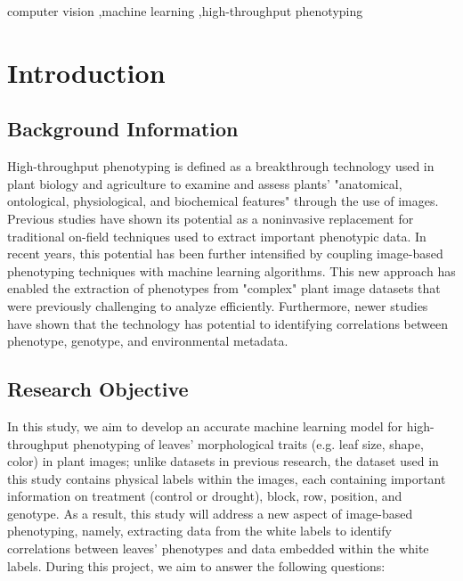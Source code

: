 \documentclass[final,5p,times,twocolumn,authoryear]{elsarticle}
\begin{document}
\begin{frontmatter}
\begin{keyword}
computer vision \sep machine learning \sep high-throughput phenotyping
\end{keyword}

\end{frontmatter}




\section{Introduction}
\label{intro}

\subsection{Background Information}
\label{background}

High-throughput phenotyping is defined as a breakthrough technology used in plant biology and agriculture to examine and assess plants' "anatomical, ontological, physiological, and biochemical features" through the use of images. Previous studies have shown its potential as a noninvasive replacement for traditional on-field techniques used to extract important phenotypic data. In recent years, this potential has been further intensified by coupling image-based phenotyping techniques with machine learning algorithms. This new approach has enabled the extraction of phenotypes from "complex" plant image datasets that were previously challenging to analyze efficiently. Furthermore, newer studies have shown that the technology has potential to identifying correlations between phenotype, genotype, and environmental metadata. 

\subsection{Research Objective}
\label{objective}

In this study, we aim to develop an accurate machine learning model for high-throughput phenotyping of leaves’ morphological traits (e.g. leaf size, shape, color) in plant images; unlike datasets in previous research, the dataset used in this study contains physical labels within the images, each containing important information on treatment (control or drought), block, row, position, and genotype. As a result, this study will address a new aspect of image-based phenotyping, namely, extracting data from the white labels to identify correlations between leaves’ phenotypes and data embedded within the white labels. During this project, we aim to answer the following questions: 
\end{document}
